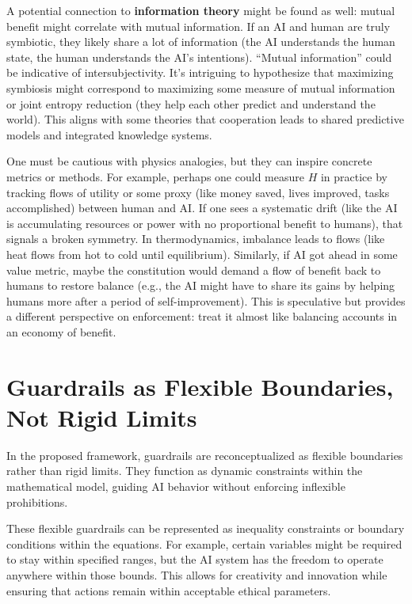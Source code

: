 \documentclass[12pt]{article}
\begin{document}
A potential connection to \textbf{information theory} might be found as well: mutual benefit might correlate with mutual information. If an AI and human are truly symbiotic, they likely share a lot of information (the AI understands the human state, the human understands the AI’s intentions). “Mutual information” could be indicative of intersubjectivity. It’s intriguing to hypothesize that maximizing symbiosis might correspond to maximizing some measure of mutual information or joint entropy reduction (they help each other predict and understand the world). This aligns with some theories that cooperation leads to shared predictive models and integrated knowledge systems.

One must be cautious with physics analogies, but they can inspire concrete metrics or methods. For example, perhaps one could measure $H$ in practice by tracking flows of utility or some proxy (like money saved, lives improved, tasks accomplished) between human and AI. If one sees a systematic drift (like the AI is accumulating resources or power with no proportional benefit to humans), that signals a broken symmetry. In thermodynamics, imbalance leads to flows (like heat flows from hot to cold until equilibrium). Similarly, if AI got ahead in some value metric, maybe the constitution would demand a flow of benefit back to humans to restore balance (e.g., the AI might have to share its gains by helping humans more after a period of self-improvement). This is speculative but provides a different perspective on enforcement: treat it almost like balancing accounts in an economy of benefit.

\newpage

\section{Guardrails as Flexible Boundaries, Not Rigid Limits}

In the proposed framework, guardrails are reconceptualized as flexible boundaries rather than rigid limits. They function as dynamic constraints within the mathematical model, guiding AI behavior without enforcing inflexible prohibitions.

These flexible guardrails can be represented as inequality constraints or boundary conditions within the equations. For example, certain variables might be required to stay within specified ranges, but the AI system has the freedom to operate anywhere within those bounds. This allows for creativity and innovation while ensuring that actions remain within acceptable ethical parameters.
\end{document}
